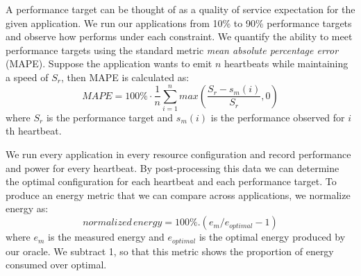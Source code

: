 A performance target can be thought of as a quality of service
expectation for the given application. We run our applications from
10\% to 90\% performance targets and observe how \SYSTEM{} performs
under each constraint. We quantify the ability to meet performance
targets using the standard metric \emph{mean absolute percentage
  error} (MAPE).  Suppose the application wants to emit $n$ heartbeats
while maintaining a speed of $S_r$, then MAPE is calculated as:
\begin{equation}
MAPE = 100\% \cdot \frac{1}{n} \sum\limits_{i=1}^{n} max \left( \frac{S_{r} - s_m(i)}{S_r},0 \right)
\end{equation}
where $S_{r}$ is the performance target and $s_m(i)$ is the
performance observed for $i$th heartbeat.


We run every
application in every resource configuration and record performance and
power for every heartbeat.  By post-processing this data we can
determine the optimal configuration for each heartbeat and each
performance target. To produce an energy metric that we can compare
across applications, we normalize energy as:
\begin{equation}
  normalized\,energy = 100\% . (e_m / e_{optimal} - 1)
\end{equation}
where $e_m$ is the measured energy and $e_{optimal}$ is the optimal
energy produced by our oracle. We subtract 1, so that this metric
shows the proportion of energy consumed over optimal. 

